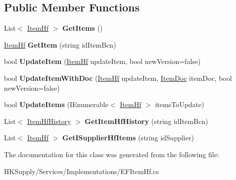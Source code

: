 \subsection*{Public Member Functions}
\begin{DoxyCompactItemize}
\item 
\mbox{\label{class_h_k_supply_1_1_services_1_1_implementations_1_1_e_f_item_hf_aae8637a3c1397a938102ccd1c49d045c}} 
List$<$ \mbox{\hyperlink{class_h_k_supply_1_1_models_1_1_item_hf}{Item\+Hf}} $>$ {\bfseries Get\+Items} ()
\item 
\mbox{\label{class_h_k_supply_1_1_services_1_1_implementations_1_1_e_f_item_hf_a23329c98e03ea535a8d6af30bf733407}} 
\mbox{\hyperlink{class_h_k_supply_1_1_models_1_1_item_hf}{Item\+Hf}} {\bfseries Get\+Item} (string id\+Item\+Bcn)
\item 
\mbox{\label{class_h_k_supply_1_1_services_1_1_implementations_1_1_e_f_item_hf_a1486506956c70f9a72d1bab22b48fdf0}} 
bool {\bfseries Update\+Item} (\mbox{\hyperlink{class_h_k_supply_1_1_models_1_1_item_hf}{Item\+Hf}} update\+Item, bool new\+Version=false)
\item 
\mbox{\label{class_h_k_supply_1_1_services_1_1_implementations_1_1_e_f_item_hf_abfe2f5f9b526923218b04960d3bf2c8f}} 
bool {\bfseries Update\+Item\+With\+Doc} (\mbox{\hyperlink{class_h_k_supply_1_1_models_1_1_item_hf}{Item\+Hf}} update\+Item, \mbox{\hyperlink{class_h_k_supply_1_1_models_1_1_item_doc}{Item\+Doc}} item\+Doc, bool new\+Version=false)
\item 
\mbox{\label{class_h_k_supply_1_1_services_1_1_implementations_1_1_e_f_item_hf_af1ee4a116684bc906cffe37bd6d7657a}} 
bool {\bfseries Update\+Items} (I\+Enumerable$<$ \mbox{\hyperlink{class_h_k_supply_1_1_models_1_1_item_hf}{Item\+Hf}} $>$ items\+To\+Update)
\item 
\mbox{\label{class_h_k_supply_1_1_services_1_1_implementations_1_1_e_f_item_hf_a3255a45650fd0599f82ed52cc50fd66d}} 
List$<$ \mbox{\hyperlink{class_h_k_supply_1_1_models_1_1_item_hf_history}{Item\+Hf\+History}} $>$ {\bfseries Get\+Item\+Hf\+History} (string id\+Item\+Bcn)
\item 
\mbox{\label{class_h_k_supply_1_1_services_1_1_implementations_1_1_e_f_item_hf_aba346af79b0a7b8c8bf22f60ed1f103c}} 
List$<$ \mbox{\hyperlink{class_h_k_supply_1_1_models_1_1_item_hf}{Item\+Hf}} $>$ {\bfseries Get\+I\+Supplier\+Hf\+Items} (string id\+Supplier)
\end{DoxyCompactItemize}


The documentation for this class was generated from the following file\+:\begin{DoxyCompactItemize}
\item 
H\+K\+Supply/\+Services/\+Implementations/E\+F\+Item\+Hf.\+cs\end{DoxyCompactItemize}
